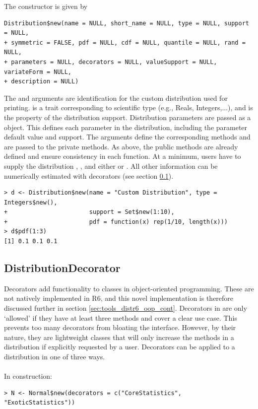 The  constructor is given by

\begin{verbatim}
Distribution$new(name = NULL, short_name = NULL, type = NULL, support = NULL,
+ symmetric = FALSE, pdf = NULL, cdf = NULL, quantile = NULL, rand = NULL,
+ parameters = NULL, decorators = NULL, valueSupport = NULL, variateForm = NULL,
+ description = NULL)
\end{verbatim}

The  and  arguments are identification for the custom distribution used for printing.  is a trait corresponding to scientific type (e.g., Reals, Integers,...), and  is the property of the distribution support. Distribution parameters are passed as a  object. This defines each parameter in the distribution, including the parameter default value and support. The  arguments define the corresponding methods and are passed to the private   methods. As above, the public methods are already defined and ensure consistency in each function. At a minimum, users have to supply the distribution , , and either  or . All other information can be numerically estimated with decorators (see section \ref{sec:tools_distr6_api_decor}).

\begin{verbatim}
> d <- Distribution$new(name = "Custom Distribution", type = Integers$new(),
+                       support = Set$new(1:10),
+                       pdf = function(x) rep(1/10, length(x)))
> d$pdf(1:3)
[1] 0.1 0.1 0.1
\end{verbatim}

\subsection{DistributionDecorator}
\label{sec:tools_distr6_api_decor}
Decorators add functionality to classes in object-oriented programming. These are not natively implemented in R6, and this novel implementation is therefore discussed further in section \ref{sec:tools_distr6_oop_cont}. Decorators in  are only `allowed' if they have at least three methods and cover a clear use case. This prevents too many decorators from bloating the interface. However, by their nature, they are lightweight classes that will only increase the methods in a distribution if explicitly requested by a user. Decorators can be applied to a distribution in one of three ways.
\\\\
In construction:
\begin{verbatim}
> N <- Normal$new(decorators = c("CoreStatistics", "ExoticStatistics"))
\end{verbatim}


